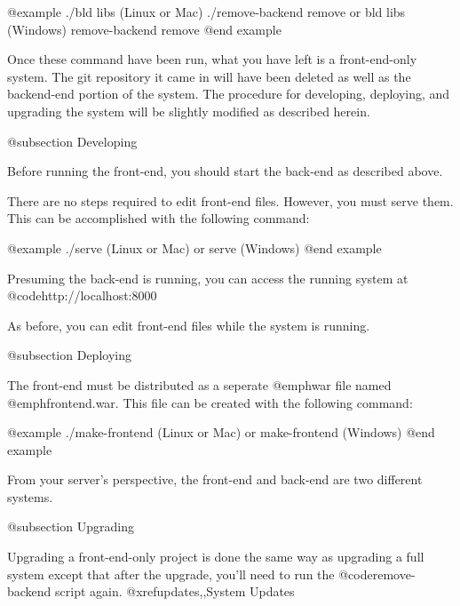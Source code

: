 @example
./bld libs                   (Linux or Mac)
./remove-backend remove
    or
bld libs                     (Windows)
remove-backend remove
@end example

Once these command have been run, what you have left is a front-end-only system.  The git 
repository it came in will have been deleted as well as the backend-end portion of the system.
The procedure for developing, deploying, and upgrading the system will be slightly modified as 
described herein.


@subsection Developing

Before running the front-end, you should start the back-end as described above.

There are no steps required to edit front-end files.  However, you must serve them.  This can be accomplished with the following command:

@example
./serve          (Linux or Mac)
    or
serve            (Windows)
@end example

Presuming the back-end is running, you can access the running system at @code{http://localhost:8000}

As before, you can edit front-end files while the system is running.

@subsection Deploying

The front-end must be distributed as a seperate @emph{war} file named @emph{frontend.war}.  
This file can be created with the following command:

@example
./make-frontend         (Linux or Mac)
     or
make-frontend           (Windows)
@end example

From your server's perspective, the front-end and back-end are two different systems.

@subsection Upgrading

Upgrading a front-end-only project is done the same way as upgrading a full system except that after the upgrade, you'll need to run the 
@code{remove-backend} script again. @xref{updates,,System Updates}
